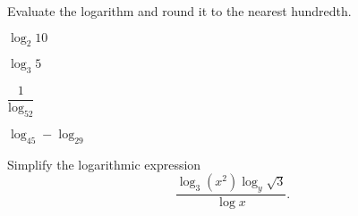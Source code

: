 \vfill
\begin{center} \hfill
\end{center}

\begin{exercise}Evaluate the logarithm and round it to the nearest hundredth.\\
	\noindent
	\begin{enumerate*}[label={(\arabic*)~}]
		\item $\log_2 10 $ %
		\item $\log_3 5  $ %
		\item $\dfrac{1}{\log_52}$
		\item $\log_45-\log_29$
		\hfill\null
	\end{enumerate*}
\end{exercise}

\vfill
\begin{center} \hfill
\end{center}


\begin{exercise}
	Simplify the logarithmic expression $$
	\frac{\log_3(x^2)\log_y\sqrt{3}}{\log x}.
	$$
\end{exercise}

\vfill
\begin{center} \hfill
\end{center}
